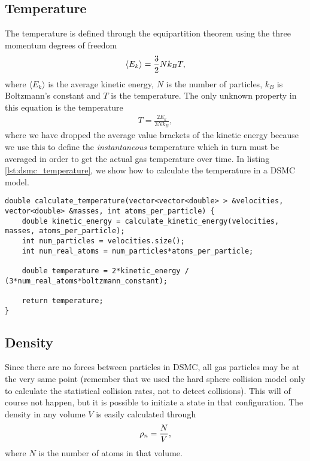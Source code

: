 \subsection{Temperature}
The temperature is defined through the equipartition theorem using the three momentum degrees of freedom
\begin{align}
	\langle E_k \rangle = {3\over 2}Nk_BT,
\end{align}
where $\langle E_k \rangle$ is the average kinetic energy, $N$ is the number of particles, $k_B$ is Boltzmann's constant and $T$ is the temperature. The only unknown property in this equation is the temperature
\begin{align}
	T = \frac{2E_k}{3Nk_B},
\end{align}
where we have dropped the average value brackets of the kinetic energy because we use this to define the \textit{instantaneous} temperature which in turn must be averaged in order to get the actual gas temperature over time. In listing \ref{lst:dsmc_temperature}, we show how to calculate the temperature in a DSMC model.

\begin{lstlisting}[caption=Calculation of instantaneous temperature., label=lst:dsmc_temperature]
double calculate_temperature(vector<vector<double> > &velocities, vector<double> &masses, int atoms_per_particle) {
	double kinetic_energy = calculate_kinetic_energy(velocities, masses, atoms_per_particle);
	int num_particles = velocities.size();
	int num_real_atoms = num_particles*atoms_per_particle;
	
	double temperature = 2*kinetic_energy / (3*num_real_atoms*boltzmann_constant);
	
	return temperature;
}
\end{lstlisting}

\subsection{Density}
Since there are no forces between particles in DSMC, all gas particles may be at the very same point (remember that we used the hard sphere collision model only to calculate the statistical collision rates, not to detect collisions). This will of course not happen, but it is possible to initiate a state in that configuration. The density in any volume $V$ is easily calculated through
\begin{align}
	\rho_n = {N \over V},
\end{align}
where $N$ is the number of atoms in that volume. 

